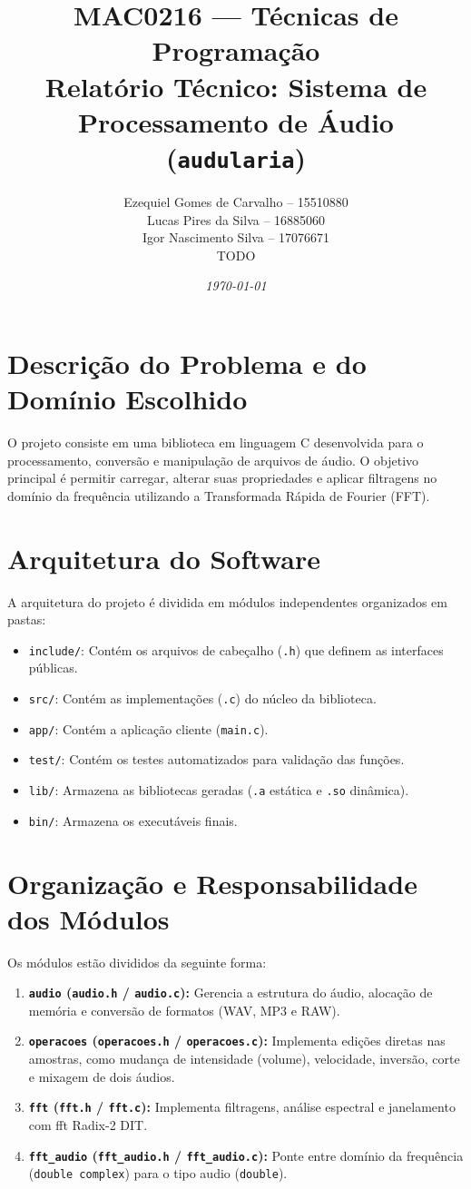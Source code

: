 \documentclass[12pt, a4paper]{article}
\title{\textbf{MAC0216 --- Técnicas de Programação\\Relatório Técnico: Sistema de Processamento de Áudio (\texttt{audularia})}}
\author{
    Ezequiel Gomes de Carvalho -- 15510880\\
    Lucas Pires da Silva -- 16885060\\
    Igor Nascimento Silva -- 17076671\\
    TODO}
\date{\textit{\small{\today}}}
\begin{document}
\maketitle

\section{Descrição do Problema e do Domínio Escolhido}
O projeto consiste em uma biblioteca em linguagem C desenvolvida para o processamento, conversão e manipulação de arquivos de áudio. O objetivo principal é permitir carregar, alterar suas propriedades  e aplicar filtragens no domínio da frequência utilizando a Transformada Rápida de Fourier (FFT).

\section{Arquitetura do Software}
A arquitetura do projeto é dividida em módulos independentes organizados em pastas:
\begin{itemize}
    \item \texttt{include/}: Contém os arquivos de cabeçalho (\texttt{.h}) que definem as interfaces públicas.
    \item \texttt{src/}: Contém as implementações (\texttt{.c}) do núcleo da biblioteca.
    \item \texttt{app/}: Contém a aplicação cliente (\texttt{main.c}).
    \item \texttt{test/}: Contém os testes automatizados para validação das funções.
    \item \texttt{lib/}: Armazena as bibliotecas geradas (\texttt{.a} estática e \texttt{.so} dinâmica).
    \item \texttt{bin/}: Armazena os executáveis finais.
\end{itemize}

\section{Organização e Responsabilidade dos Módulos}
Os módulos estão divididos da seguinte forma:
\begin{enumerate}
    \item \textbf{\texttt{audio} (\texttt{audio.h} / \texttt{audio.c}):} Gerencia a estrutura do áudio, alocação de memória e conversão de formatos (WAV, MP3 e RAW).
    \item \textbf{\texttt{operacoes} (\texttt{operacoes.h} / \texttt{operacoes.c}):} Implementa edições diretas nas amostras, como mudança de intensidade (volume), velocidade, inversão, corte e mixagem de dois áudios.
    \item \textbf{\texttt{fft} (\texttt{fft.h} / \texttt{fft.c}):} Implementa filtragens, análise espectral e janelamento com fft Radix-2 DIT.
    \item \textbf{\texttt{fft\_audio} (\texttt{fft\_audio.h} / \texttt{fft\_audio.c}):} Ponte entre domínio da frequência (\texttt{double complex}) para o tipo audio (\texttt{double}).
\end{enumerate}
\end{document}
